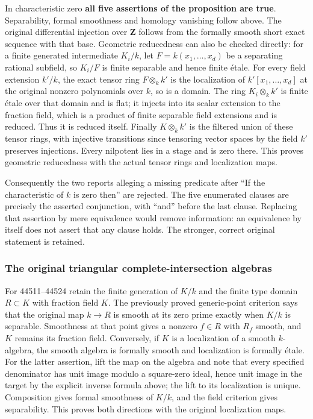In characteristic zero \textbf{all five assertions of the proposition are true}. Separability, formal smoothness and homology vanishing follow above. The original differential injection over \(\mathbf Z\) follows from the formally smooth short exact sequence with that base. Geometric reducedness can also be checked directly: for a finite generated intermediate \(K_i/k\), let \(F=k(x_1,\ldots,x_d)\) be a separating rational subfield, so \(K_i/F\) is finite separable and hence finite étale. For every field extension \(k'/k\), the exact tensor ring \(F\otimes_k k'\) is the localization of \(k'[x_1,\ldots,x_d]\) at the original nonzero polynomials over \(k\), so is a domain. The ring \(K_i\otimes_k k'\) is finite étale over that domain and is flat; it injects into its scalar extension to the fraction field, which is a product of finite separable field extensions and is reduced. Thus it is reduced itself. Finally \(K\otimes_k k'\) is the filtered union of these tensor rings, with injective transitions since tensoring vector spaces by the field \(k'\) preserves injections. Every nilpotent lies in a stage and is zero there. This proves geometric reducedness with the actual tensor rings and localization maps.

Consequently the two reports alleging a missing predicate after ``If the characteristic of \(k\) is zero then'' are rejected. The five enumerated clauses are precisely the asserted conjunction, with ``and'' before the last clause. Replacing that assertion by mere equivalence would remove information: an equivalence by itself does not assert that any clause holds. The stronger, correct original statement is retained.

\subsubsection{The original triangular complete-intersection algebras}\label{the-original-triangular-complete-intersection-algebras}

For 44511--44524 retain the finite generation of \(K/k\) and the finite type domain \(R\subset K\) with fraction field \(K\). The previously proved generic-point criterion says that the original map \(k\to R\) is smooth at its zero prime exactly when \(K/k\) is separable. Smoothness at that point gives a nonzero \(f\in R\) with \(R_f\) smooth, and \(K\) remains its fraction field. Conversely, if \(K\) is a localization of a smooth \(k\)-algebra, the smooth algebra is formally smooth and localization is formally étale. For the latter assertion, lift the map on the algebra and note that every specified denominator has unit image modulo a square-zero ideal, hence unit image in the target by the explicit inverse formula above; the lift to its localization is unique. Composition gives formal smoothness of \(K/k\), and the field criterion gives separability. This proves both directions with the original localization maps.

